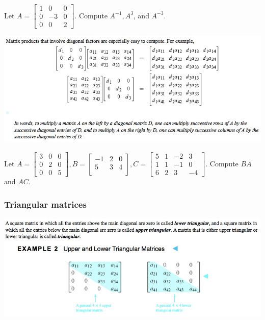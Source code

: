 \documentclass[12pt,letterpaper,reqno]{article}
\numberwithin{equation}{section}
\begin{document}
\begin{exercise}
Let $A=\begin{bmatrix}
		1 & 0 & 0 \\ 0 & -3 & 0 \\ 0 & 0 & 2
	\end{bmatrix}$. Compute $A^{-1}, A^3$, and $A^{-3}$.
\end{exercise}

\includegraphics[scale=0.55]{figures_mvc/Mult_by_Diagonal_Matrix}

\begin{exercise}
Let $A=\begin{bmatrix}
	3 & 0 & 0 \\ 0 & 2 & 0 \\ 0 & 0 & 5
\end{bmatrix}, B=\begin{bmatrix}
	-1 & 2 & 0 \\ 5 & 3 & 4 \\ 
\end{bmatrix}, C=\begin{bmatrix}
	5 & 1 & -2 & 3 \\ 1 & 1 & -1 & 0 \\ 
	6 & 2 & 3 & -4
\end{bmatrix}$. Compute $BA$ and $AC$.
\end{exercise}

\subsubsection{Triangular matrices}
	\includegraphics[scale=0.55]{figures_mvc/Triangular_Matrices} 
	
\end{document}
